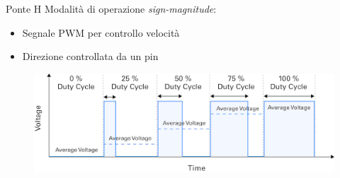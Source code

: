 \documentclass{beamer}
\begin{document}
\begin{tframe}{Ponte H}
Modalità di operazione \textit{sign-magnitude}:
\begin{itemize}
    \item Segnale PWM per controllo velocità
    \item Direzione controllata da un pin
\end{itemize}
    \begin{figure}
         \centering
         \includegraphics[width=\columnwidth]{img/pwm.jpg}
    \end{figure}
\end{tframe}
\end{document}
